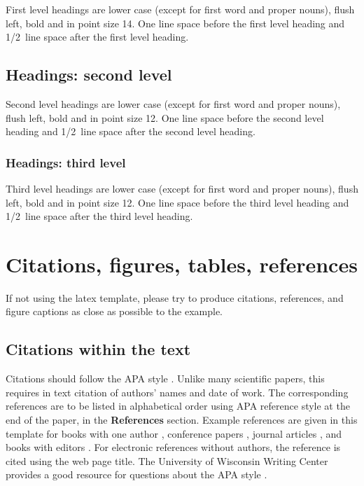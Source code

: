 \documentclass{article}
\begin{document}
First level headings are lower case (except for first word and
proper nouns), flush left, bold and in point size 14. One line space
before the first level heading and 1/2~line space after the first
level heading.

\subsection{Headings: second level}

Second level headings are lower case (except for first word and
proper nouns), flush left, bold and in point size 12. One line space
before the second level heading and 1/2~line space after the second
level heading.

\subsubsection{Headings: third level}

Third level headings are lower case (except for first word and
proper nouns), flush left, bold and in point size 12. One line space
before the third level heading and 1/2~line space after the third
level heading.

\section{Citations, figures, tables, references}
\label{others}

If not using the  latex template, please try to produce citations,
references, and figure captions as close as possible to the example.

\subsection{Citations within the text}

Citations should follow the APA style \cite{apa}. Unlike many
scientific papers, this requires in text citation of authors' names
and date of work. The corresponding references are to be listed in
alphabetical order using APA reference style at the end of the
paper, in the \textbf{References} section. Example references are
given in this template for books with one author \cite{baxter},
conference papers \cite{binh}, journal articles \cite{baldwin}, and
books with editors \cite{stock}. For electronic references without
authors, the reference is cited using the web page title. The
University of Wisconsin Writing Center provides a good resource for
questions about the APA style \cite{wisconsin}.
\end{document}
